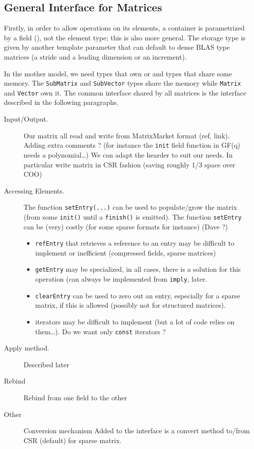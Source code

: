 \subsection{General Interface for %
Matrices}
%
Firstly, in order to allow operations on its elements, a container is
parametrized by a field (\cf {}), not the element type; this is
also more general.  The storage type is given by another template parameter
that can default to \eg dense BLAS type matrices (a stride and a leading
dimension or an increment).
%

%
In the mother model, we need types that own or and types that share some
memory.  The \texttt{SubMatrix} and \texttt{SubVector} types share the memory
while \texttt{Matrix} and \texttt{Vector} own it.
%
The common interface shared by all matrices is the \applin  interface described
in the following paragraphs.
%
% 
%
\begin{description}
%
	\item[Input/Output.] Our matrix all read and write from MatrixMarket
		format (ref, link).  Adding extra comments ? (for instance the
		{\tt init} field function in GF(q) needs a polynomial\ldots) We
		can adapt the hearder to suit our needs. In particular write
		matrix in CSR fashion (saving roughly 1/3 space over COO)
%
	\item[Accessing Elements.] The function \texttt{setEntry(...)} can be
		used to populate/grow the matrix (from some \texttt{init()}
		until a \texttt{finish()} is emitted).  The function
		\texttt{setEntry} can be (very) costly (for some sparse formats
		for instance) (Dave ?)
%
		\begin{itemize}
			\item \texttt{refEntry} that retrieves a reference to
				an entry may be difficult to implement or
				inefficient (compressed fields, sparse
				matrices)
			\item \texttt{getEntry} may be specialized, in all
				cases, there is a solution for this operation
				(can always be implemented from \texttt{imply},
				\cf{} later.
			\item \texttt{clearEntry} can be used to zero out an
				entry, especially for a sparse matrix, if this
				is allowed (possibly not for structured
				matrices).
			\item iterators may be difficult to implement (but a
				lot of code relies on them\ldots). Do we want
				only {\tt const} iterators ?
%
		\end{itemize}
%
	\item[Apply method.]
		Described later
%
	\item[Rebind] Rebind from one field to the other
%
	\item[Other] Conversion mechanism Added to the interface is a convert
		method to/from CSR (default) for sparse matrix.
%
\end{description}
%
